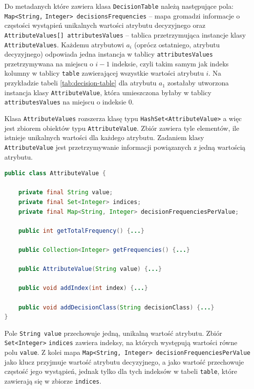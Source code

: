 \documentclass[12pt]{article}
\begin{document}
Do metadanych które zawiera klasa \verb|DecisionTable| należą następujące pola: \verb|Map<String,| \verb|Integer> decisionsFrequencies| -- mapa gromadzi informacje o częstości wystąpień
unikalnych wartości atrybutu decyzyjnego oraz \verb|AttributeValues[] attributesValues| -- tablica przetrzymująca instancje klasy \verb|AttributeValues|. Każdemu
atrybutowi $a_i$ (oprócz ostatniego, atrybutu decyzyjnego) odpowiada jedna instancja w tablicy \verb|attributesValues| przetrzymywana na miejscu o $i-1$ indeksie, czyli
takim samym jak indeks kolumny w tablicy \verb|table| zawierającej wszystkie wartości atrybutu $i$. Na przykładzie tabeli \ref{tab:decision-table} dla atrybutu $a_1$ zostałaby utworzona instancja klasy \verb|AttributeValue|, która umieszczona byłaby w tablicy
\verb|attributesValues| na miejscu o indeksie $0$.

Klasa \verb|AttributeValues| rozszerza klasę typu \verb|HashSet<AttributeValue>| a więc jest zbiorem obiektów typu \verb|AttributeValue|.
Zbiór zawiera tyle elementów, ile istnieje unikalnych wartości dla każdego atrybutu. Zadaniem klasy \verb|AttributeValue| jest przetrzymywanie informacji
powiązanych z jedną wartością atrybutu.

\begin{lstlisting}[language=java, caption=Skrócona implementacja klasy AttributeValue,frame=single,label={lst:attribute-value-class}]
public class AttributeValue {

    private final String value;
    private final Set<Integer> indices;
    private final Map<String, Integer> decisionFrequenciesPerValue;

    public int getTotalFrequency() {...}

    public Collection<Integer> getFrequencies() {...}

    public AttributeValue(String value) {...}

    public void addIndex(int index) {...}

    public void addDecisionClass(String decisionClass) {...}
}
\end{lstlisting}
\newpage

Pole \verb|String value| przechowuje jedną, unikalną wartość atrybutu. Zbiór \verb|Set<Integer>| \verb|indices| zawiera indeksy, na których występują
wartości równe polu \verb|value|. Z kolei mapa \verb|Map<String, Integer> decisionFrequenciesPerValue| jako klucz przyjmuje wartość atrybutu decyzyjnego,
a jako wartość przechowuje częstość jego wystąpień, jednak tylko dla tych indeksów w tabeli \verb|table|, które zawierają się w zbiorze \verb|indices|.
\end{document}
